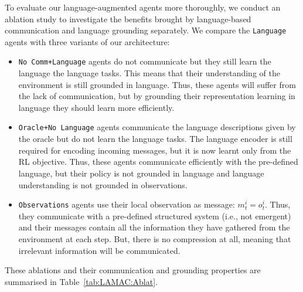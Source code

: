 To evaluate our language-augmented agents more thoroughly, we conduct an ablation study to investigate the benefits brought by language-based communication and language grounding separately. We compare the \texttt{Language} agents with three variants of our architecture:
\begin{itemize}
    \item \texttt{No Comm+Language} agents do not communicate but they still learn the language the language tasks. This means that their understanding of the environment is still grounded in language. Thus, these agents will suffer from the lack of communication, but by grounding their representation learning in language they should learn more efficiently. 
    \item \texttt{Oracle+No Language} agents communicate the language descriptions given by the oracle but do not learn the language tasks. The language encoder is still required for encoding incoming messages, but it is now learnt only from the RL objective. Thus, these agents communicate efficiently with the pre-defined language, but their policy is not grounded in language and language understanding is not grounded in observations. 
    \item \texttt{Observations} agents use their local observation as message: $m^i_t=o_t^i$. Thus, they communicate with a pre-defined structured system (i.e., not emergent) and their messages contain all the information they have gathered from the environment at each step. But, there is no compression at all, meaning that irrelevant information will be communicated.  
\end{itemize}
These ablations and their communication and grounding properties are summarised in Table~\ref{tab:LAMAC:Ablat}. 

